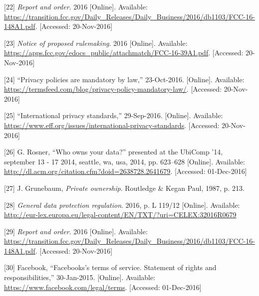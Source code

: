\documentclass[12pt,english,a4paper,titlepage,cleardoublepage=empty,dottedtoc]{report}
\begin{document}
\hypertarget{ref-rules_2016_fcc_to-protect-broadband-consumer-privacy_sensitive-types-of-data}{}
{[}22{]} \emph{Report and order}. 2016 {[}Online{]}. Available:
\url{https://transition.fcc.gov/Daily_Releases/Daily_Business/2016/db1103/FCC-16-148A1.pdf}.
{[}Accessed: 20-Nov-2016{]}

\hypertarget{ref-rules_2016_fcc_to-protect-broadband-consumer-privacy_personally-identifiable-information}{}
{[}23{]} \emph{Notice of proposed rulemaking}. 2016 {[}Online{]}.
Available:
\url{https://apps.fcc.gov/edocs_public/attachmatch/FCC-16-39A1.pdf}.
{[}Accessed: 20-Nov-2016{]}

\hypertarget{ref-web_2016_privacy-policies-are-mandatory-by-law}{}
{[}24{]} ``Privacy policies are mandatory by law,'' 23-Oct-2016.
{[}Online{]}. Available:
\url{https://termsfeed.com/blog/privacy-policy-mandatory-law/}.
{[}Accessed: 20-Nov-2016{]}

\hypertarget{ref-web_2016_international-privacy-standards}{}
{[}25{]} ``International privacy standards,'' 29-Sep-2016. {[}Online{]}.
Available:
\url{https://www.eff.org/issues/international-privacy-standards}.
{[}Accessed: 20-Nov-2016{]}

\hypertarget{ref-paper_2014_who-owns-yours-data}{}
{[}26{]} G. Rosner, ``Who owns your data?'' presented at the UbiComp
'14, september 13 - 17 2014, seattle, wa, usa, 2014, pp. 623--628
{[}Online{]}. Available:
\url{http://dl.acm.org/citation.cfm?doid=2638728.2641679}. {[}Accessed:
01-Dec-2016{]}

\hypertarget{ref-book_1987_private-ownership_definition}{}
{[}27{]} J. Grunebaum, \emph{Private ownership}. Routledge \& Kegan
Paul, 1987, p. 213.

\hypertarget{ref-regulation_2016_eu_general-data-protection-regulation_ownership}{}
{[}28{]} \emph{General data protection regulation}. 2016, p. L 119/12
{[}Online{]}. Available:
\url{http://eur-lex.europa.eu/legal-content/EN/TXT/?uri=CELEX:32016R0679}

\hypertarget{ref-rules_2016_fcc_to-protect-broadband-consumer-privacy_ownership}{}
{[}29{]} \emph{Report and order}. 2016 {[}Online{]}. Available:
\url{https://transition.fcc.gov/Daily_Releases/Daily_Business/2016/db1103/FCC-16-148A1.pdf}.
{[}Accessed: 20-Nov-2016{]}

\hypertarget{ref-web_2016_facebook_terms-of-service}{}
{[}30{]} Facebook, ``Facebooks's terms of service. Statement of rights
and responsibilities,'' 30-Jan-2015. {[}Online{]}. Available:
\url{https://www.facebook.com/legal/terms}. {[}Accessed: 01-Dec-2016{]}
\end{document}
